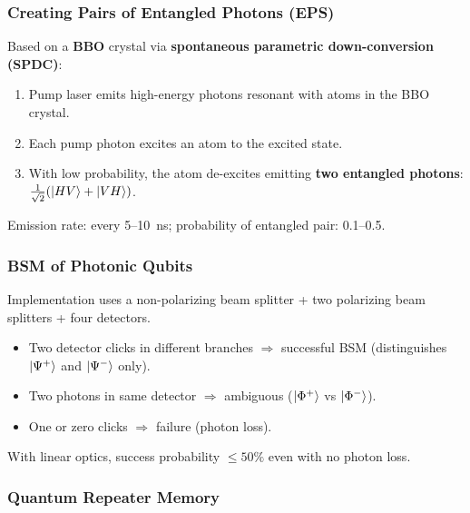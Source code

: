 \documentclass[10pt,a4paper]{article}
\begin{document}
\subsubsection*{Creating Pairs of Entangled Photons (EPS)}

\begin{tcolorbox}[defstyle, title={Definition}]
Based on a \textbf{BBO} crystal via \textbf{spontaneous parametric down-conversion (SPDC)}:
\begin{enumerate}[nosep]
\item Pump laser emits high-energy photons resonant with atoms in the BBO crystal.
\item Each pump photon excites an atom to the excited state.
\item With low probability, the atom de-excites emitting \textbf{two entangled photons}: $\tfrac{1}{\sqrt{2}}(\ket{HV}+\ket{VH})$.
\end{enumerate}
Emission rate: every 5--10~ns; probability of entangled pair: 0.1--0.5.
\end{tcolorbox}

\subsubsection*{BSM of Photonic Qubits}

\begin{tcolorbox}[defstyle, title={Definition}]
Implementation uses a non-polarizing beam splitter + two polarizing beam splitters + four detectors.
\begin{itemize}[nosep]
\item Two detector clicks in different branches $\Rightarrow$ successful BSM (distinguishes $\ket{\Psi^+}$ and $\ket{\Psi^-}$ only).
\item Two photons in same detector $\Rightarrow$ ambiguous ($\ket{\Phi^+}$ vs $\ket{\Phi^-}$).
\item One or zero clicks $\Rightarrow$ failure (photon loss).
\end{itemize}
With linear optics, success probability $\leq 50\%$ even with no photon loss.
\end{tcolorbox}

\subsubsection*{Quantum Repeater Memory}
\end{document}
